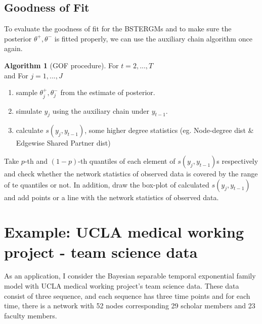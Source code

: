 \documentclass[aspectratio=169,ignorenonframetext,9pt]{beamer}
\theoremstyle{plain}
\theoremstyle{definition}
\newtheorem{algo}{Algorithm}[section]
\begin{document}
\subsection{Goodness of Fit}
To evaluate the goodness of fit for the BSTERGMs and to make sure the posterior $\theta^+,\theta^-$ is fitted properly,
we can use the auxiliary chain algorithm once again.
\begin{algo}[GOF procedure]
    For $t=2,...,T$ \\
    and For $j=1,...,J$
    \begin{enumerate}
        \item sample $\theta_j^+,\theta_j^-$ from the estimate of posterior.
        \item simulate $y_j$ using the auxiliary chain under $y_{t-1}$.
        \item calculate $s(y_j, y_{t-1})$, some higher degree statistics (eg. Node-degree dist \& Edgewise Shared Partner dist)
    \end{enumerate}
    Take $p$-th and $(1-p)$-th quantiles of each element of $s(y_j, y_{t-1})$s respectively and check 
    whether the network statistics of observed data is covered by the range of te quantiles or not.
    In addition, draw the box-plot of calculated $s(y_j, y_{t-1})$ and add points or a line with the network statistics of observed data.
\end{algo}


\section{Example: UCLA medical working project - team science data}
As an application, I consider the Bayesian separable temporal exponential family model with UCLA medical working project's team science data.
These data consist of three sequence,
and each sequence has three time points and for each time,
there is a network with 52 nodes corresponding 29 scholar members and 23 faculty members.
\end{document}
